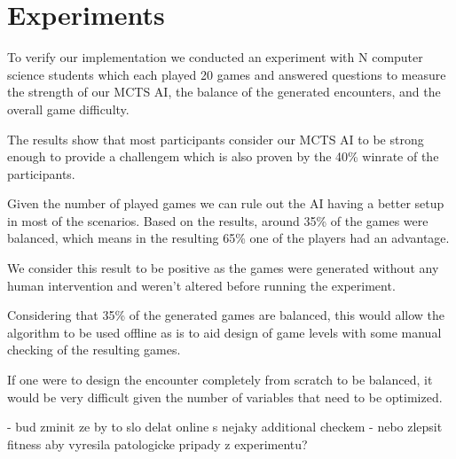\chapter{Experiments}

To verify our implementation we conducted an experiment with N 
computer science students which each played 20 games and answered questions
to measure the strength of our MCTS AI, the balance of the generated encounters,
and the overall game difficulty.


The results show that most participants consider our MCTS AI to be strong
enough to provide a challengem which is also proven by the 40\% winrate of
the participants. 

Given the number of played games  we can
rule out the AI having a better setup in most of the scenarios. Based on the
results, around 35\%  of the games were balanced,
which means in the resulting 65\% one of the players had an advantage.

We consider this result to be positive as the games were generated without
any human intervention and weren't altered before running the experiment.

Considering that 35\% of the generated games are balanced, this would allow
the algorithm to be used offline as is to aid design of game levels with
some manual checking of the resulting games.

If one were to design the encounter completely from scratch to be balanced,
it would be very difficult given the number of variables that need to be
optimized.

- bud zminit ze by to slo delat online s nejaky additional checkem
- nebo zlepsit fitness aby vyresila patologicke pripady z experimentu?